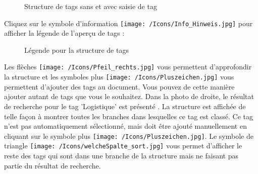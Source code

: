 \begin{figure}[H]
\caption{Structure de tags sans et avec saisie de tag}
\end{figure}

Cliquez sur le symbole d'information \texttt{[image: /Icons/Info\_Hinweis.jpg]}  pour afficher la légende de l'aperçu de tags :

\begin{figure}[H]
\caption{Légende pour la structure de tags}
\end{figure}

Les flèches \texttt{[image: /Icons/Pfeil\_rechts.jpg]} vous permettent d'approfondir la structure et les symboles plus \texttt{[image: /Icons/Pluszeichen.jpg]} vous permettent d'ajouter des tags au document. Vous pouvez de cette manière ajouter autant de tags que vous le souhaitez. Dans la photo de droite, le résultat de recherche pour le tag 'Logistique' est présenté . La structure est affichée de telle façon à montrer toutes les branches dans lesquelles ce tag est classé. Ce tag n'est pas automatiquement sélectionné, mais doit être ajouté manuellement en cliquant sur le symbole plus \texttt{[image: /Icons/Pluszeichen.jpg]}. Le symbole de triangle \texttt{[image: /Icons/welcheSpalte\_sort.jpg]} vous permet d'afficher le reste des tags qui sont dans une branche de la structure mais ne faisant pas partie du résultat de recherche. \newline

